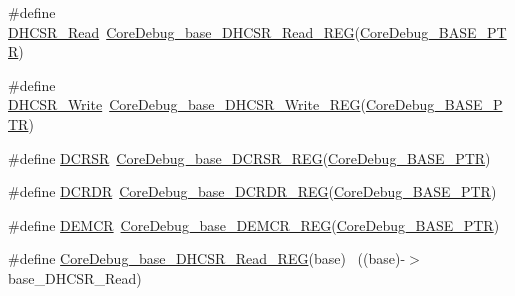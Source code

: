 \begin{DoxyCompactItemize}
\item 
\#define \hyperlink{group___core_debug___register___accessor___macros_ga7d77eafe76b2000c7159e58e11ade9a1}{D\+H\+C\+S\+R\+\_\+\+Read}~\hyperlink{group___core_debug___register___accessor___macros_gaea44925e7b9cc3155d55c86d77ecb8dc}{Core\+Debug\+\_\+base\+\_\+\+D\+H\+C\+S\+R\+\_\+\+Read\+\_\+\+R\+EG}(\hyperlink{group___core_debug___peripheral_ga994a185afca30ede538d89322c4f0326}{Core\+Debug\+\_\+\+B\+A\+S\+E\+\_\+\+P\+TR})
\item 
\#define \hyperlink{group___core_debug___register___accessor___macros_ga3c374ff0f88587d03fd707ebc0a06169}{D\+H\+C\+S\+R\+\_\+\+Write}~\hyperlink{group___core_debug___register___accessor___macros_gaf54a5a2086e1362b034c5ae9d566f261}{Core\+Debug\+\_\+base\+\_\+\+D\+H\+C\+S\+R\+\_\+\+Write\+\_\+\+R\+EG}(\hyperlink{group___core_debug___peripheral_ga994a185afca30ede538d89322c4f0326}{Core\+Debug\+\_\+\+B\+A\+S\+E\+\_\+\+P\+TR})
\item 
\#define \hyperlink{group___core_debug___register___accessor___macros_gabd5ddab120c0e09c0198d49c25713be3}{D\+C\+R\+SR}~\hyperlink{group___core_debug___register___accessor___macros_ga5f44f54e6c3b28720c9f888292d2eef5}{Core\+Debug\+\_\+base\+\_\+\+D\+C\+R\+S\+R\+\_\+\+R\+EG}(\hyperlink{group___core_debug___peripheral_ga994a185afca30ede538d89322c4f0326}{Core\+Debug\+\_\+\+B\+A\+S\+E\+\_\+\+P\+TR})
\item 
\#define \hyperlink{group___core_debug___register___accessor___macros_gaaa7a4f8f79faea1305f3398257c656a0}{D\+C\+R\+DR}~\hyperlink{group___core_debug___register___accessor___macros_gac60388e54792a5460ba042a1e6917ce7}{Core\+Debug\+\_\+base\+\_\+\+D\+C\+R\+D\+R\+\_\+\+R\+EG}(\hyperlink{group___core_debug___peripheral_ga994a185afca30ede538d89322c4f0326}{Core\+Debug\+\_\+\+B\+A\+S\+E\+\_\+\+P\+TR})
\item 
\#define \hyperlink{group___core_debug___register___accessor___macros_gab6c5b1baf444f12ba50bfc3b0e40e05c}{D\+E\+M\+CR}~\hyperlink{group___core_debug___register___accessor___macros_ga068f04cd2820bf5a12caeb1c9f6afa51}{Core\+Debug\+\_\+base\+\_\+\+D\+E\+M\+C\+R\+\_\+\+R\+EG}(\hyperlink{group___core_debug___peripheral_ga994a185afca30ede538d89322c4f0326}{Core\+Debug\+\_\+\+B\+A\+S\+E\+\_\+\+P\+TR})
\item 
\#define \hyperlink{group___core_debug___register___accessor___macros_gaea44925e7b9cc3155d55c86d77ecb8dc}{Core\+Debug\+\_\+base\+\_\+\+D\+H\+C\+S\+R\+\_\+\+Read\+\_\+\+R\+EG}(base)        ~((base)-\/$>$base\+\_\+\+D\+H\+C\+S\+R\+\_\+\+Read)
\item 

\end{DoxyCompactItemize}
